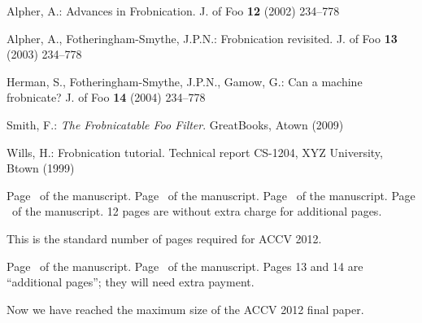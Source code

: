 \documentclass[runningheads]{llncs}
\begin{document}


\begin{thebibliography}{1}

Alpher, A.:
Advances in Frobnication.
J. of Foo
\textbf{12} (2002)  234--778

Alpher, A., Fotheringham-Smythe, J.P.N.:
Frobnication revisited.
J. of Foo
\textbf{13} (2003)  234--778

Herman, S., Fotheringham-Smythe, J.P.N., Gamow, G.:
Can a machine frobnicate?
J. of Foo
\textbf{14} (2004)  234--778

Smith, F.:
{\it The Frobnicatable Foo Filter}.
GreatBooks, Atown (2009)

Wills, H.:
Frobnication tutorial.
Technical report CS-1204, XYZ University, Btown (1999)

\end{thebibliography}


\clearpage\mbox{}Page \thepage\ of the manuscript.
\clearpage\mbox{}Page \thepage\ of the manuscript.
\clearpage\mbox{}Page \thepage\ of the manuscript.
\clearpage\mbox{}Page \thepage\ of the manuscript.
12 pages are without extra charge for additional pages.
\par\vfill\par
This is the standard number of pages required for ACCV 2012.

\clearpage\mbox{}Page \thepage\ of the manuscript.
\clearpage\mbox{}Page \thepage\ of the manuscript.
Pages 13 and 14 are ``additional pages''; they will need extra payment.
\par\vfill\par
Now we have reached the maximum size of the ACCV 2012 final paper.
\end{document}
